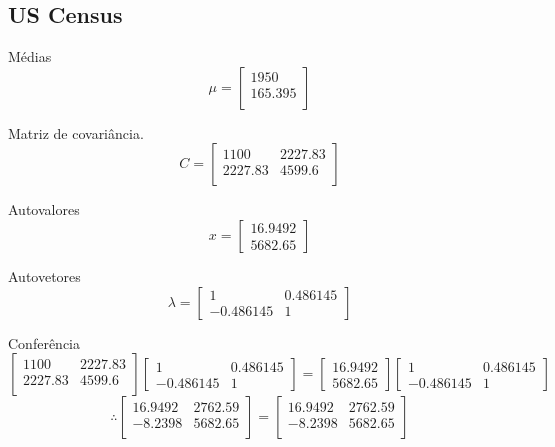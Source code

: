 \documentclass[a4paper, 11pt]{article}
\begin{document}
\subsection*{US Census}
Médias
$$ \mu =
\begin{bmatrix}
1950 \\
165.395\\
\end{bmatrix}
$$

Matriz de covariância.
$$ C =
\begin{bmatrix}
1100&2227.83\\
2227.83&4599.6\\
\end{bmatrix}
$$

Autovalores
$$ x =
\begin{bmatrix}
16.9492\\
5682.65
\end{bmatrix}
$$

Autovetores
$$ \lambda =
\begin{bmatrix}
1&0.486145\\
-0.486145&1
\end{bmatrix}
$$

Conferência
$$
\begin{bmatrix}
1100&2227.83\\
2227.83&4599.6\\
\end{bmatrix}
\begin{bmatrix}
1&0.486145\\
-0.486145&1
\end{bmatrix}
=
\begin{bmatrix}
16.9492\\
5682.65
\end{bmatrix}
\begin{bmatrix}
1&0.486145\\
-0.486145&1
\end{bmatrix}
$$
$$
\therefore
\begin{bmatrix}
16.9492&2762.59\\
-8.2398&5682.65\\
\end{bmatrix}
=
\begin{bmatrix}
16.9492&2762.59\\
-8.2398&5682.65\\
\end{bmatrix}
$$


\end{document}
